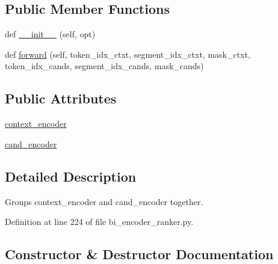 \subsection*{Public Member Functions}
\begin{DoxyCompactItemize}
\item 
def \hyperlink{classparlai_1_1agents_1_1bert__ranker_1_1bi__encoder__ranker_1_1BiEncoderModule_a81f376495538cf4d413cd9b63184d045}{\+\_\+\+\_\+init\+\_\+\+\_\+} (self, opt)
\item 
def \hyperlink{classparlai_1_1agents_1_1bert__ranker_1_1bi__encoder__ranker_1_1BiEncoderModule_a74b6c842e6e99d8a86f669e385ae48e9}{forward} (self, token\+\_\+idx\+\_\+ctxt, segment\+\_\+idx\+\_\+ctxt, mask\+\_\+ctxt, token\+\_\+idx\+\_\+cands, segment\+\_\+idx\+\_\+cands, mask\+\_\+cands)
\end{DoxyCompactItemize}
\subsection*{Public Attributes}
\begin{DoxyCompactItemize}
\item 
\hyperlink{classparlai_1_1agents_1_1bert__ranker_1_1bi__encoder__ranker_1_1BiEncoderModule_aa92bf5d244fe4f11ea2211353d7aad6f}{context\+\_\+encoder}
\item 
\hyperlink{classparlai_1_1agents_1_1bert__ranker_1_1bi__encoder__ranker_1_1BiEncoderModule_a719af14e2b84f3a52eec12b94ff0c35f}{cand\+\_\+encoder}
\end{DoxyCompactItemize}


\subsection{Detailed Description}
\begin{DoxyVerb}Groups context_encoder and cand_encoder together.
\end{DoxyVerb}
 

Definition at line 224 of file bi\+\_\+encoder\+\_\+ranker.\+py.



\subsection{Constructor \& Destructor Documentation}
\mbox{\label{classparlai_1_1agents_1_1bert__ranker_1_1bi__encoder__ranker_1_1BiEncoderModule_a81f376495538cf4d413cd9b63184d045}} 
